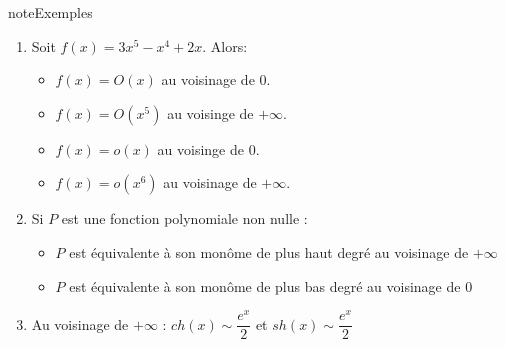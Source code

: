\documentclass[letterpaper,10pt,french]{jupyterBook}
\begin{document}
\begin{sphinxadmonition}{note}{Exemples}
\begin{enumerate}
%
\item {} 
\sphinxAtStartPar
Soit \(f(x) = 3x^5 − x^4 + 2x\). Alors:
\begin{itemize}
\item {} 
\sphinxAtStartPar
\(f(x) = O(x)\) au voisinage de \(0\).

\item {} 
\sphinxAtStartPar
\(f(x) = O(x^5)\) au voisinge de \(+\infty\).

\item {} 
\sphinxAtStartPar
\(f(x) = o(x)\) au voisinge de \(0\).

\item {} 
\sphinxAtStartPar
\(f(x) = o(x^6)\) au voisinage de \(+\infty\).

\end{itemize}

\item {} 
\sphinxAtStartPar
Si \(P\) est une fonction polynomiale non nulle :
\begin{itemize}
\item {} 
\sphinxAtStartPar
\(P\) est équivalente à son monôme de plus haut degré au voisinage de \(+\infty\)

\item {} 
\sphinxAtStartPar
\(P\) est équivalente à son monôme de plus bas degré au voisinage de \(0\)

\end{itemize}

\item {} 
\sphinxAtStartPar
Au voisinage de \(+\infty\) : \(ch(x) \sim \dfrac{e^x}{2}\) et \(sh(x) \sim \dfrac{e^x}{2}\)

\end{enumerate}
\end{sphinxadmonition}
\end{document}
